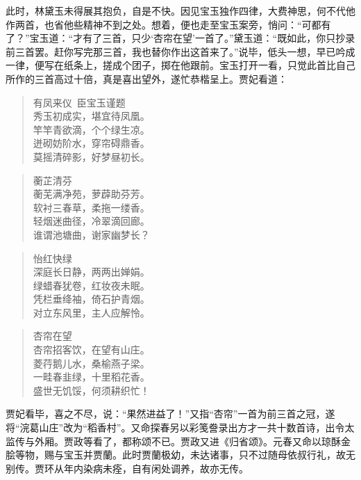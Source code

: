 \documentclass[12pt,oneside]{book}
\newenvironment{shici}{%
\begin{verse}%
\centering\large\hspace{12pt}}%
{\end{verse}}
\begin{document}
此时，林黛玉未得展其抱负，自是不快。因见宝玉独作四律，大费神思，何不代他作两首，也省他些精神不到之处。想着，便也走至宝玉案旁，悄问：“可都有了？”宝玉道：“才有了三首，只少‘杏帘在望’一首了。”黛玉道：“既如此，你只抄录前三首罢。赶你写完那三首，我也替你作出这首来了。”说毕，低头一想，早已吟成一律，便写在纸条上，搓成个团子，掷在他跟前。宝玉打开一看，只觉此首比自己所作的三首高过十倍，真是喜出望外，遂忙恭楷呈上。贾妃看道：

\begin{shici}
有凤来仪~臣宝玉谨题\\
秀玉初成实，堪宜待凤凰。\\
竿竿青欲滴，个个绿生凉。\\
迸砌妨阶水，穿帘碍鼎香。\\
莫摇清碎影，好梦昼初长。
\end{shici}

\begin{shici}
蘅芷清芬\\
蘅芜满净苑，萝薜助芬芳。\\
软衬三春草，柔拖一缕香。\\
轻烟迷曲径，冷翠滴回廊。\\
谁谓池塘曲，谢家幽梦长？
\end{shici}

\begin{shici}
怡红快绿\\
深庭长日静，两两出婵娟。\\
绿蜡春犹卷，红妆夜未眠。\\
凭栏垂绛袖，倚石护青烟。\\
对立东风里，主人应解怜。
\end{shici}

\begin{shici}
杏帘在望\\
杏帘招客饮，在望有山庄。\\
菱荇鹅儿水，桑榆燕子梁。\\
一畦春韭绿，十里稻花香。\\
盛世无饥馁，何须耕织忙！
\end{shici}


贾妃看毕，喜之不尽，说：“果然进益了！”又指“杏帘”一首为前三首之冠，遂将“浣葛山庄”改为“稻香村”。又命探春另以彩笺誊录出方才一共十数首诗，出令太监传与外厢。贾政等看了，都称颂不已。贾政又进《归省颂》。元春又命以琼酥金脍等物，赐与宝玉并贾蘭。此时贾蘭极幼，未达诸事，只不过随母依叔行礼，故无别传。贾环从年内染病未痊，自有闲处调养，故亦无传。
\end{document}
